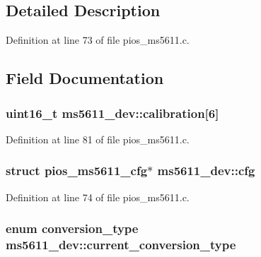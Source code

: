 \subsection{\-Detailed \-Description}


\-Definition at line 73 of file pios\-\_\-ms5611.\-c.



\subsection{\-Field \-Documentation}
\hypertarget{structms5611__dev_a70397164fa20e861a6d63d2662398656}{
\subsubsection[{calibration}]{\setlength{\rightskip}{0pt plus 5cm}uint16\-\_\-t {\bf ms5611\-\_\-dev\-::calibration}\mbox{[}6\mbox{]}}}\label{structms5611__dev_a70397164fa20e861a6d63d2662398656}


\-Definition at line 81 of file pios\-\_\-ms5611.\-c.

\hypertarget{structms5611__dev_a574b60b9bc78dd7806922d127ef46f02}{
\subsubsection[{cfg}]{\setlength{\rightskip}{0pt plus 5cm}struct {\bf pios\-\_\-ms5611\-\_\-cfg}$\ast$ {\bf ms5611\-\_\-dev\-::cfg}}}\label{structms5611__dev_a574b60b9bc78dd7806922d127ef46f02}


\-Definition at line 74 of file pios\-\_\-ms5611.\-c.

\hypertarget{structms5611__dev_aa8a4e5f38a07817e999f55e10263a13b}{
\subsubsection[{current\-\_\-conversion\-\_\-type}]{\setlength{\rightskip}{0pt plus 5cm}enum {\bf conversion\-\_\-type} {\bf ms5611\-\_\-dev\-::current\-\_\-conversion\-\_\-type}}}\label{structms5611__dev_aa8a4e5f38a07817e999f55e10263a13b}


